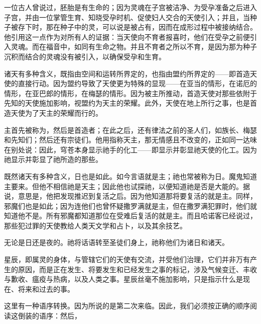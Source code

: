 一位古人曾说过，胚胎是有生命的；因为灵魂在子宫被洁净、为受孕准备之后进入子宫，并由一位掌管生育、知晓受孕时机、促使妇人交合的天使引入；并且，当种子被存下时，那在种子中的灵，可以说是被占有，因而在成形过程中被接纳结合。他引用这一点作为对所有人的证据：当天使向不育者报喜时，他们在受孕之前便引入灵魂。而在福音中，如同有生命之物。并且不育者之所以不育，是因为那为种子沉积而结合的灵魂没有被引入，以确保受孕和生育。\par

诸天有多种含义，既指由空间和运转所界定的，也指由盟约所界定的——即首造天使的直接行动。因为盟约导致了天使更为特殊的显现——在亚当的情形，在诺厄的情形，在亚巴郎的情形，在梅瑟的情形。因为被主所推动，首造天使对那些依附于先知的天使施加影响，视盟约为天主的荣耀。此外，天使在地上所行之事，也是首造天使为了天主的荣耀而行的。\par

主首先被称为，然后是首造者；在此之后，还有律法之前的圣人们，如族长、梅瑟和先知们；然后还有宗徒们。他用指称天主，那无情感且不改变的，正如同一达味在别处说：因此，穹苍本身显示祂手的化工——即显示并彰显祂天使的化工。因为祂显示并彰显了祂所造的那些。\par

既然诸天有多种含义，日也是如此。如今言语就是主；祂也常被称为日。魔鬼知道主要来。但他不相信祂是天主；因此他也试探祂，以便知道祂是否是大能的。据说，意思是，他把发现推迟到复活之后。因为他知道那将要复活的就是主。同样，邪魔们也是如此；因为连他们也曾怀疑撒罗满就是主，但在撒罗满犯罪时，他们就知道他不是。所有邪魔都知道那位在受难后复活的就是主。而且哈诺客已经说过，那些犯过罪的天使教给人类天文学和占卜，以及其余技艺。\par

无论是日还是夜的。祂将话语转至圣徒们身上，祂称他们为诸日和诸天。\par

星辰，即属灵的身体，与管辖它们的天使有交流，并受他们治理，它们并非万有产生的原因，而是正在发生、将要发生和已经发生之事的标记，涉及气候变迁、丰收与歉收、瘟疫与热病，以及人类之事。星辰丝毫不施加影响，只是指示什么是现在、将来和过去的事。\par

这里有一种语序转换。因为所说的是第二次来临。因此，我们必须按正确的顺序阅读这倒装的语序：然后，\par

